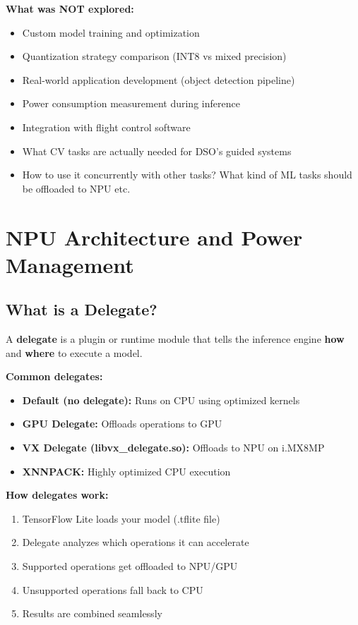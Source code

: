 \documentclass[12pt,a4paper]{report}
\begin{document}
\textbf{What was NOT explored:}
\begin{itemize}
    \item Custom model training and optimization
    \item Quantization strategy comparison (INT8 vs mixed precision)
    \item Real-world application development (object detection pipeline)
    \item Power consumption measurement during inference
    \item Integration with flight control software
    \item What CV tasks are actually needed for DSO's guided systems
    \item How to use it concurrently with other tasks? What kind of ML tasks should be offloaded to NPU etc. 
\end{itemize}

\section{NPU Architecture and Power Management}

\subsection{What is a Delegate?}

A \textbf{delegate} is a plugin or runtime module that tells the inference engine \textbf{how} and \textbf{where} to execute a model.

\textbf{Common delegates:}
\begin{itemize}
    \item \textbf{Default (no delegate):} Runs on CPU using optimized kernels
    \item \textbf{GPU Delegate:} Offloads operations to GPU
    \item \textbf{VX Delegate (libvx\_delegate.so):} Offloads to NPU on i.MX8MP
    \item \textbf{XNNPACK:} Highly optimized CPU execution
\end{itemize}

\textbf{How delegates work:}
\begin{enumerate}
    \item TensorFlow Lite loads your model (.tflite file)
    \item Delegate analyzes which operations it can accelerate
    \item Supported operations get offloaded to NPU/GPU
    \item Unsupported operations fall back to CPU
    \item Results are combined seamlessly
\end{enumerate}
\end{document}
